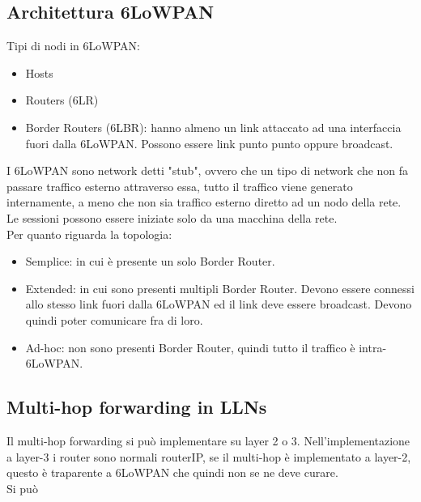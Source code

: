 \documentclass{article}
\begin{document}
\subsection{Architettura 6LoWPAN}
Tipi di nodi in 6LoWPAN:
\begin{itemize}
    \item Hosts 
    \item Routers (6LR)
    \item Border Routers (6LBR): hanno almeno un link attaccato ad una interfaccia fuori dalla 6LoWPAN. Possono essere link punto punto oppure broadcast.
\end{itemize}
I 6LoWPAN sono network detti "stub", ovvero che un tipo di network che non fa passare traffico esterno attraverso essa, tutto il traffico viene generato internamente, a meno che non sia traffico esterno diretto ad un nodo della rete. Le sessioni possono essere iniziate solo da una macchina della rete. \\ Per quanto riguarda la topologia:
\begin{itemize}
    \item Semplice: in cui è presente un solo Border Router.
    \item Extended: in cui sono presenti multipli Border Router. Devono essere connessi allo stesso link fuori dalla 6LoWPAN ed il link deve essere broadcast. Devono quindi poter comunicare fra di loro.
    \item Ad-hoc: non sono presenti Border Router, quindi tutto il traffico è intra-6LoWPAN.
\end{itemize}

\subsection{Multi-hop forwarding in LLNs}
Il multi-hop forwarding si può implementare su layer 2 o 3. Nell'implementazione a layer-3 i router sono normali routerIP, se il multi-hop è implementato a layer-2, questo è traparente a 6LoWPAN che quindi non se ne deve curare. \\ Si può 
\end{document}
